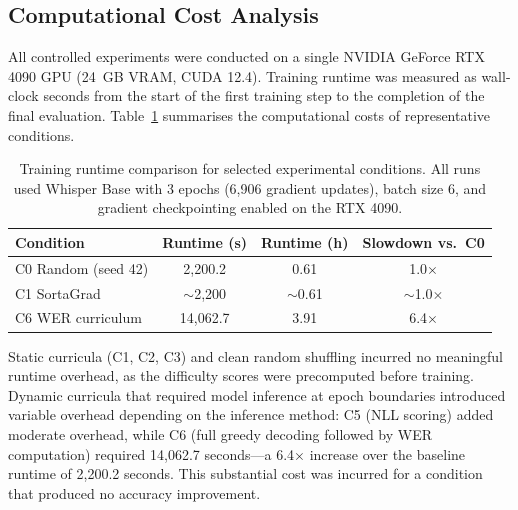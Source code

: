 \subsection{Computational Cost Analysis}
\label{sec:computational-cost}

All controlled experiments were conducted on a single NVIDIA GeForce RTX 4090
GPU (24~GB VRAM, CUDA 12.4). Training runtime was measured as wall-clock seconds
from the start of the first training step to the completion of the final
evaluation. Table~\ref{tab:runtime} summarises the computational costs of
representative conditions.

\begin{table}[H]
\centering
\caption{Training runtime comparison for selected experimental conditions. All
runs used Whisper Base with 3 epochs (6{,}906 gradient updates), batch size 6,
and gradient checkpointing enabled on the RTX 4090.}
\label{tab:runtime}
\begin{tabular}{lccc}
\hline
\textbf{Condition} & \textbf{Runtime (s)} & \textbf{Runtime (h)} & \textbf{Slowdown vs.\ C0} \\
\hline
C0 Random (seed 42)       & 2{,}200.2  & 0.61 & 1.0$\times$ \\
C1 SortaGrad              & $\sim$2{,}200 & $\sim$0.61 & $\sim$1.0$\times$ \\
C6 WER curriculum         & 14{,}062.7 & 3.91 & 6.4$\times$ \\
\hline
\end{tabular}
\end{table}

Static curricula (C1, C2, C3) and clean random shuffling incurred no meaningful
runtime overhead, as the difficulty scores were precomputed before training.
Dynamic curricula that required model inference at epoch boundaries introduced
variable overhead depending on the inference method: C5 (NLL scoring) added
moderate overhead, while C6 (full greedy decoding followed by WER computation)
required 14{,}062.7 seconds---a 6.4$\times$ increase over the baseline runtime
of 2{,}200.2 seconds. This substantial cost was incurred for a condition that
produced no accuracy improvement.



